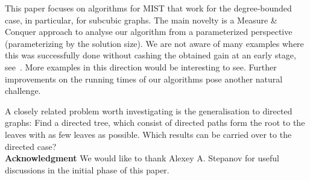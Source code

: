 \documentclass{llncs}
\newcommand{\longversion}[1]{#1}
\newcommand{\mist}{\textsc{MIST}\xspace}
\begin{document}
This paper focuses on algorithms for \mist that work for the degree-bounded case, in particular,
for subcubic graphs. The main novelty is a Measure \& Conquer approach
to analyse our algorithm from a parameterized perspective (parameterizing by the solution size). We are not aware of many examples 
where this was successfully done without cashing the obtained gain at an early stage, see~\cite{Wah2007}. More examples in
this direction would be interesting to see. 
\longversion{Further improvements on the running times of our algorithms pose another natural challenge.}

A closely related problem worth investigating is the generalisation to directed graphs: Find a directed tree, which consist of directed paths form the root to the leaves with as few leaves as possible. Which results can be carried over to the directed case?\\[1ex]
\textbf{Acknowledgment} We would like to thank Alexey A. Stepanov for useful discussions in the initial phase of this paper.
\end{document}

